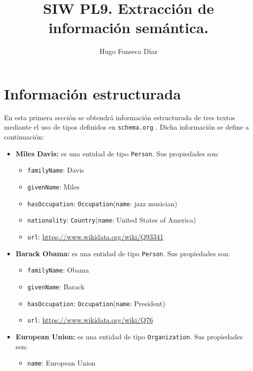 \documentclass[11pt]{article}
\begin{document}
\title{SIW PL9. Extracción de información semántica.}
\author{Hugo Fonseca Díaz\\ }
\maketitle
\section{Información estructurada}
En esta primera sección se obtendrá información estructurada de tres textos mediante el uso de tipos definidos en \verb|schema.org| \cite{schemaorg}. Dicha información se define a continuación:

\begin{itemize}
    \item \textbf{Miles Davis:} es una entidad de tipo \verb|Person|. Sus propiedades son:
        \begin{itemize}
            \item \verb|familyName|: Davis
            \item \verb|givenName|: Miles
            \item \verb|hasOccupation|: \verb|Occupation|(\verb|name|: jazz musician)
            \item \verb|nationality|: \verb|Country|(\verb|name|: United States of America)
            \item \verb|url|: \url{https://www.wikidata.org/wiki/Q93341}
        \end{itemize}
    \item \textbf{Barack Obama:} es una entidad de tipo \verb|Person|. Sus propiedades son:
        \begin{itemize}
            \item \verb|familyName|: Obama
            \item \verb|givenName|: Barack
            \item \verb|hasOccupation|: \verb|Occupation|(\verb|name|: President)
            \item \verb|url|: \url{https://www.wikidata.org/wiki/Q76}
        \end{itemize}
    \item \textbf{European Union:} es una entidad de tipo \verb|Organization|. Sus propiedades son:
        \begin{itemize}
            \item \verb|name|: European Union

\end{itemize}
\end{itemize}
\end{document}
